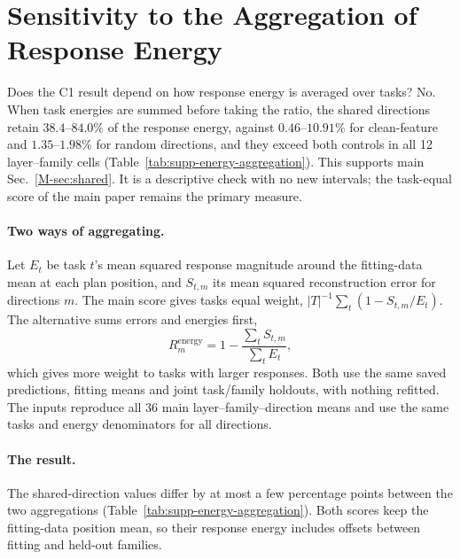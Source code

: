 \clearpage
\section{Sensitivity to the Aggregation of Response Energy}
\label{sec:supp-energy-aggregation}
Does the C1 result depend on how response energy is averaged over tasks? No. When task energies are summed before taking the ratio, the shared directions retain $38.4$--$84.0\%$ of the response energy, against $0.46$--$10.91\%$ for clean-feature and $1.35$--$1.98\%$ for random directions, and they exceed both controls in all 12 layer--family cells (Table~\ref{tab:supp-energy-aggregation}). This supports main Sec.~\ref*{M-sec:shared}. It is a descriptive check with no new intervals; the task-equal score of the main paper remains the primary measure.

\paragraph{Two ways of aggregating.}
Let $E_t$ be task $t$'s mean squared response magnitude around the fitting-data mean at each plan position, and $S_{t,m}$ its mean squared reconstruction error for directions $m$. The main score gives tasks equal weight, $|T|^{-1}\sum_t(1-S_{t,m}/E_t)$. The alternative sums errors and energies first,
\begin{equation}
R_m^{\mathrm{energy}}=1-\frac{\sum_t S_{t,m}}{\sum_t E_t},
\end{equation}
which gives more weight to tasks with larger responses. Both use the same saved predictions, fitting means and joint task/family holdouts, with nothing refitted. The inputs reproduce all 36 main layer--family--direction means and use the same tasks and energy denominators for all directions.

\paragraph{The result.}
The shared-direction values differ by at most a few percentage points between the two aggregations (Table~\ref{tab:supp-energy-aggregation}). Both scores keep the fitting-data position mean, so their response energy includes offsets between fitting and held-out families.

